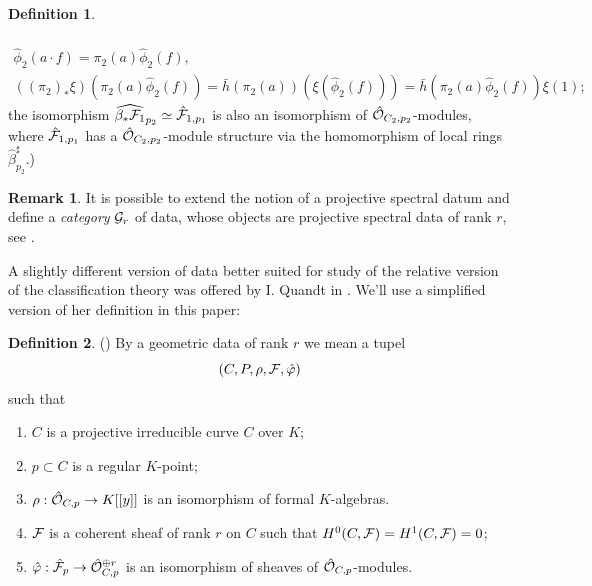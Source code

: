 \documentclass[11pt]{article}
\theoremstyle{definition}
\newcommand{\cg}{{{\cal G}}}
\newtheorem{Def}{Definition}[section]
\newtheorem{rem}{Remark}[section]
\theoremstyle{plain}
\numberwithin{equation}{section}
\newcommand{\co}{{{\cal O}}}
\newcommand{\cf}{{{\cal F}}}
\begin{document}
\begin{Def}
\begin{itemize}
\begin{multline*}
\end{multline*} 
\begin{multline*}
\hat{\phi}_2(a\cdot f)=\pi_2(a)\hat{\phi}_2(f), \quad \\
((\pi_2)_*\xi )(\pi_2(a)\hat{\phi}_2(f))=\bar{h}(\pi_2(a))(\xi (\hat{\phi}_2(f)))=\bar{h}(\pi_2(a)\hat{\phi}_2(f))\xi (1);
\end{multline*} 
the isomorphism $\widehat{\beta_*\cf_1}_{p_2}\simeq \hat{\cf}_{1,p_1}$ is also an isomorphism of $\hat{\co}_{C_2,p_2}$-modules, where $\hat{\cf}_{1,p_1}$ has a $\hat{\co}_{C_2,p_2}$-module structure via the homomorphism of local rings $\hat{\beta}_{p_2}^{\sharp}$.) 
\end{itemize}
\end{Def}

\begin{rem}
It is possible to extend the notion of a projective spectral datum  and define a {\it category} $\cg_r$ of data, whose objects are projective spectral data of rank $r$, see \cite{Mu}.
\end{rem} 

A slightly different version of data better suited for study of the relative version of the classification theory was offered by I. Quandt in \cite{Q}. We'll use a simplified version of her definition in this paper:

\begin{Def}{(\cite[Def.2.9]{Q})}
\label{Q2.9}
By a geometric data of rank $r$  we mean a tupel 
$$
(C, P,\rho ,\cf ,\hat{\varphi} )
$$
such that 
\begin{enumerate}
\item
$C$ is a projective irreducible curve $C$ over $K$;
\item
$p\subset C$ is a regular $K$-point; 
\item
$\rho :\hat{\co}_{C,p} \rightarrow K[[y]]$ is an isomorphism of formal $K$-algebras. 
\item
$\cf$ is a coherent sheaf of rank $r$ on $C$ such that $H^0(C, \cf )= H^1(C, \cf) =0$;
\item
$\hat{\varphi} :\hat{\cf}_p \rightarrow \hat{\co}_{C,p}^{\oplus r}$ is an isomorphism of sheaves of $\hat{\co}_{C,p}$-modules.
\end{enumerate}
\end{Def}
\end{document}

